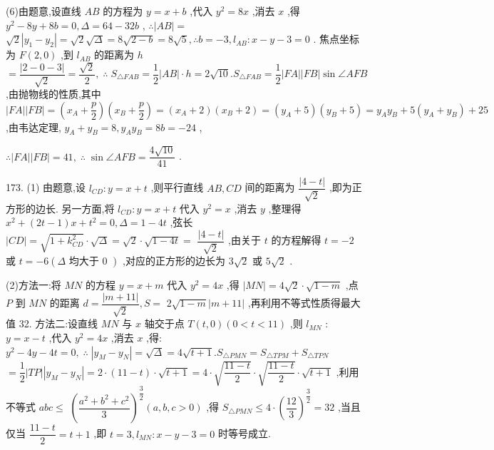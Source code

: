 (6)由题意,设直线 ${AB}$ 的方程为 $y = x + b$ ,代入 ${y}^{2} = {8x}$ ,消去 $x$ ,得 ${y}^{2} - {8y} + {8b} = 0,\Delta  = {64} - {32b}$ , $\therefore \left| {AB}\right|  =$  $\sqrt{2}\left| {{y}_{1} - {y}_{2}}\right|  = \sqrt{2}\sqrt{\Delta } = 8\sqrt{2 - b} = 8\sqrt{5},\therefore b =  - 3,{l}_{AB} : x - y - 3 = 0$ . 焦点坐标为 $F\left( {2,0}\right)$ ,到 ${l}_{AB}$ 的距离为 $h$  $= \dfrac{\left| 2 - 0 - 3\right| }{\sqrt{2}} = \dfrac{\sqrt{2}}{2},\;\therefore \;{S}_{\bigtriangleup {FAB}} = \dfrac{1}{2}\left| {AB}\right|  \cdot  h = 2\sqrt{10}.{S}_{\bigtriangleup {FAB}} = \dfrac{1}{2}\left| {FA}\right| \left| {FB}\right| \sin \angle {AFB}$ ,由抛物线的性质,其中 $\left| {FA}\right| \left| {FB}\right|  = \left( {{x}_{A} + \dfrac{p}{2}}\right) \left( {{x}_{B} + \dfrac{p}{2}}\right)  = \left( {{x}_{A} + 2}\right) \left( {{x}_{B} + 2}\right)  = \left( {{y}_{A} + 5}\right) \left( {{y}_{B} + 5}\right)  = {y}_{A}{y}_{B} + 5\left( {{y}_{A} + {y}_{B}}\right)  + {25}$ ,由韦达定理, ${y}_{A} + {y}_{B} = 8,{y}_{A}{y}_{B} = {8b} =  - {24}$ ,

$\therefore \left| {FA}\right| \left| {FB}\right|  = {41},\;\therefore \;\sin \angle {AFB} = \dfrac{4\sqrt{10}}{41}$ .

173. (1) 由题意,设 ${l}_{CD} : y = x + t$ ,则平行直线 ${AB},{CD}$ 间的距离为 $\dfrac{\left| 4 - t\right| }{\sqrt{2}}$ ,即为正方形的边长. 另一方面,将 ${l}_{CD} : y = x + t$ 代入 ${y}^{2} = x$ ,消去 $y$ ,整理得 ${x}^{2} + \left( {{2t} - 1}\right) x + {t}^{2} = 0,\Delta  = 1 - {4t}$ ,弦长 $\left| {CD}\right|  = \sqrt{1 + {k}_{CD}^{2}} \cdot  \sqrt{\Delta } = \sqrt{2} \cdot  \sqrt{1 - {4t}} =$  $\dfrac{\left| 4 - t\right| }{\sqrt{2}}$ ,由关于 $t$ 的方程解得 $t =  - 2$ 或 $t =  - 6\left( {\Delta \text{ 均大于 0 }}\right)$ ,对应的正方形的边长为 $3\sqrt{2}$ 或 $5\sqrt{2}$ .

(2)方法一:将 ${MN}$ 的方程 $y = x + m$ 代入 ${y}^{2} = {4x}$ ,得 $\left| {MN}\right|  = 4\sqrt{2} \cdot  \sqrt{1 - m}$ ,点 $P$ 到 ${MN}$ 的距离 $d = \dfrac{\left| m + {11}\right| }{\sqrt{2}},S =$  $2\sqrt{1 - m}\left| {m + {11}}\right|$ ,再利用不等式性质得最大值 32. 方法二:设直线 ${MN}$ 与 $x$ 轴交于点 $T\left( {t,0}\right) \left( {0 < t < {11}}\right)$ ,则 ${l}_{MN}$ : $y = x - t$ ,代入 ${y}^{2} = {4x}$ ,消去 $x$ ,得: ${y}^{2} - {4y} - {4t} = 0,\;\therefore \;\left| {{y}_{M} - {y}_{N}}\right|  = \sqrt{\Delta } = 4\sqrt{t + 1}.{S}_{\bigtriangleup {PMN}} = {S}_{\bigtriangleup {TPM}} + {S}_{\bigtriangleup {TPN}}$  $= \dfrac{1}{2}\left| {TP}\right| \left| {{y}_{M} - {y}_{N}}\right|  = 2 \cdot  \left( {{11} - t}\right)  \cdot  \sqrt{t + 1} = 4 \cdot  \sqrt{\dfrac{{11} - t}{2}} \cdot  \sqrt{\dfrac{{11} - t}{2}} \cdot  \sqrt{t + 1}$ ,利用不等式 ${abc} \leq$  ${\left( \dfrac{{a}^{2} + {b}^{2} + {c}^{2}}{3}\right) }^{\dfrac{3}{2}}\left( {a,b,c > 0}\right)$ ,得 ${S}_{\bigtriangleup {PMN}} \leq  4 \cdot  {\left( \dfrac{12}{3}\right) }^{\dfrac{3}{2}} = {32}$ ,当且仅当 $\dfrac{{11} - t}{2} = t + 1$ ,即 $t = 3,{l}_{MN} : x - y - 3 = 0$ 时等号成立.

